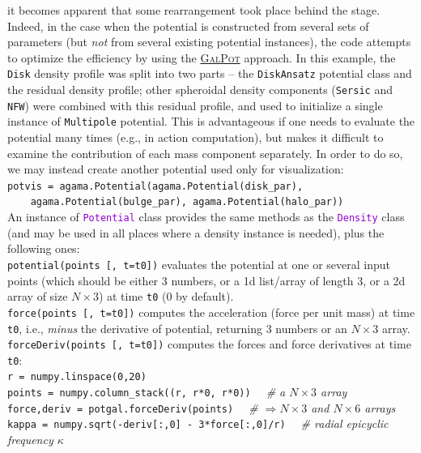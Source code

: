 \documentclass[12pt]{article}
\newcommand{\ttt}[1]{\textcolor{darkviolet}{\texttt{#1}}}
\newcommand{\ppp}[1]{\textcolor{darkolive} {\texttt{#1}}}
\begin{document}
it becomes apparent that some rearrangement took place behind the stage. Indeed, in the case when the potential is constructed from several sets of parameters (but \textit{not} from several existing potential instances), the code attempts to optimize the efficiency by using the \hyperref[sec:PotentialGalpot]{\textsc{GalPot}} approach. In this example, the \ppp{Disk} density profile was split into two parts -- the \ppp{DiskAnsatz} potential class and the residual density profile; other spheroidal density components (\ppp{Sersic} and \ppp{NFW}) were combined with this residual profile, and used to initialize a single instance of \ppp{Multipole} potential. This is advantageous if one needs to evaluate the potential many times (e.g., in action computation), but makes it difficult to examine the contribution of each mass component separately. In order to do so, we may instead create another potential used only for visualization:\\
\texttt{potvis~= agama.Potential(agama.Potential(disk_par), }\\
\texttt{\mbox{}~~~~agama.Potential(bulge_par), agama.Potential(halo_par))}\\[2mm]
An instance of \ttt{Potential} class provides the same methods as the \ttt{Density} class (and may be used in all places where a density instance is needed), plus the following ones:\\[2mm]
\texttt{potential(points [, t=t0])} evaluates the potential at one or several input points (which should be either 3 numbers, or a 1d list/array of length 3, or a 2d array of size $N\times3$) at time \texttt{t0} (0 by default).\\[2mm]
\texttt{force(points [, t=t0])} computes the acceleration (force per unit mass) at time \texttt{t0}, i.e., \textit{minus} the derivative of potential, returning 3 numbers or an $N\times3$ array.\\[2mm]
\texttt{forceDeriv(points [, t=t0])} computes the forces and force derivatives at time \texttt{t0}:\\[1mm]
\texttt{r = numpy.linspace(0,20)}\\
\texttt{points = numpy.column_stack((r, r*0, r*0))}
\textit{\color{Sepia} \ \ \# a $N\times3$ array}\\
\texttt{force,deriv = potgal.forceDeriv(points)}
\textit{\color{Sepia} \ \ \# $\Rightarrow N\times3$ and $N\times6$ arrays} \\
\texttt{kappa = numpy.sqrt(-deriv[:,0] - 3*force[:,0]/r)}
\textit{\color{Sepia} \ \ \# radial epicyclic frequency $\kappa$} \\
\end{document}
